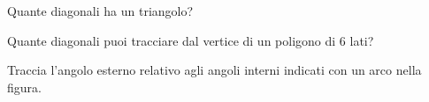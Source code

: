 \begin{esercizio}
\label{ese:1.125}
Quante diagonali ha un triangolo?
\end{esercizio}

\begin{esercizio}
\label{ese:1.126}
Quante diagonali puoi tracciare dal vertice di un poligono di 6 lati?
\end{esercizio}


\begin{esercizio}
\label{ese:1.127}
Traccia l'angolo esterno relativo agli angoli interni indicati con un 
arco nella figura.
\end{esercizio}
\begin{center}
 \begin{inaccessibleblock}
 
\end{inaccessibleblock}
\end{center}




